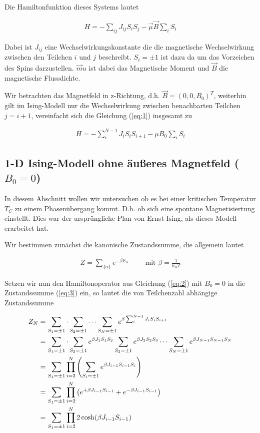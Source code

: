 Die Hamiltonfunktion dieses Systems lautet

\begin{align}
  \label{eq:1}
  H = -\sum_{ij}J_{ij}S_iS_j - \vec \mu \vec B \sum_i S_i
\end{align}

Dabei ist \(J_{ij} \) eine Wechselwirkungskonstante die die magnetische Wechselwirkung zwischen den Teilchen \(i\) und \(j\) beschreibt. \(S_i=\pm 1\) ist dazu da um das Vorzeichen des Spins darzustellen. \(\vec mu\) ist dabei das Magnetische Moment und \(\vec B\) die magnetische Flussdichte. 

Wir betrachten das Magnetfeld in z-Richtung, d.h. \(\vec B = (0,0,B_0)^T\), weiterhin gilt im Ising-Modell nur die Wechselwirkung zwischen benachbarten Teilchen \(j=i+1\), vereinfacht sich die Gleichung (\ref{eq:1}) insgesamt zu

\begin{align}
  \label{eq:2}
  H = -\sum_{i}^{N-1}J_{i}S_iS_{i+1} - \mu B_0 \sum_i S_i
\end{align}

\subsection*{1-D Ising-Modell ohne äußeres Magnetfeld ($B_0=0$)}

In diesem Abschnitt wollen wir untersuchen ob es bei einer kritischen Temperatur \(T_C\) zu einem Phasenübergang kommt. D.h. ob sich eine spontane Magnetisiertung einstellt. Dies war der ursprüngliche Plan von Ernst Ising, als dieses Modell erarbeitet hat.

Wir bestimmen zunächst die kanonische Zustandssumme, die allgemein lautet

\begin{align}
  \label{eq:3}
  Z = \sum_{\{\alpha\}} e^{-\beta E_\alpha} \qquad \text{ mit }\beta = \frac{1}{k_B T}
\end{align}

Setzen wir nun den Hamiltonoperator aus Gleichung (\ref{eq:2}) mit \(B_0=0\) in die Zustandssumme (\ref{eq:3}) ein, so lautet die von Teilchenzahl abhängige Zustandssumme

\begin{align}
  \label{eq:4}
    Z_N &= \sum_{S_1=\pm 1}\cdot\sum_{S_2=\pm 1}\cdots\sum_{S_N=\pm 1}  e^{\beta \sum_{i}^{N-1}J_{i}S_iS_{i+1}} \notag\\
&= \sum_{S_1=\pm 1}\cdot\sum_{S_2=\pm 1} e^{\beta J_{1}S_{1}S_2}\sum_{S_3=\pm 1}e^{\beta J_{2} S_2 S_3} \cdots\sum_{S_N=\pm 1}  e^{\beta J_{N-1}S_{N-1}S_{N}} \notag\\
&= \sum_{S_1=\pm 1}\prod_{i=2}^N\left( \sum_{S_i=\pm 1} e^{\beta J_{i-1}S_{i-1}S_i}\right) \notag\\
&= \sum_{S_1=\pm 1}\prod_{i=2}^N\left( e^{ + \beta J_{i-1}S_{i-1}}+ e^{ - \beta J_{i-1}S_{i-1}} \right)\notag\\
&= \sum_{S_1=\pm 1}\prod_{i=2}^N2\cosh( \beta J_{i-1}S_{i-1})
\end{align}


